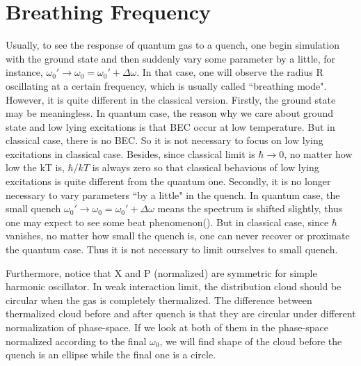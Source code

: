 \documentclass[aps,pre,twocolumn,groupedaddress]{revtex4-1}
\begin{document}
\section{Breathing Frequency}\label{section:breathing frequency}
Usually, to see the response of quantum gas to a quench, one begin simulation with the ground state and then suddenly vary some parameter by a little, for instance, $\omega_0'\rightarrow\omega_0=\omega_0'+\Delta\omega$. In that case, one will observe the radius R oscillating at a certain frequency, which is usually called ``breathing mode".
However, it is quite different in the classical version. Firstly, the ground state may be meaningless. In quantum case, the reason why we care about ground state and low lying excitations is that BEC occur at low temperature. But in classical case, there is no BEC. So it is not necessary to focus on low lying excitations in classical case. Besides, since classical limit is $\hbar\rightarrow 0$, no matter how low the kT is, $\hbar/kT$ is always zero so that classical behavious of low lying excitations is quite different from the quantum one. Secondly, it is no longer necessary to vary parameters ``by a little" in the quench. In quantum case, the small quench $\omega_0'\rightarrow\omega_0=\omega_0'+\Delta\omega$ means the spectrum is shifted slightly, thus one may expect to see some beat phenomenon({\color{red}{?}}). But in classical case, since $\hbar$ vanishes, no matter how small the quench is, one can never recover or proximate the quantum case. Thus it is not necessary to limit ourselves to small quench. 

Furthermore, notice that X and P (normalized) are symmetric for simple harmonic oscillator. In weak interaction limit, the distribution cloud should be circular when the gas is completely thermalized. The difference between thermalized cloud before and after quench is that they are circular under different normalization of phase-space. If we look at both of them in the phase-space normalized according to the final $\omega_0$, we will find shape of the cloud before the quench is an ellipse while the final one is a circle.
\end{document}
